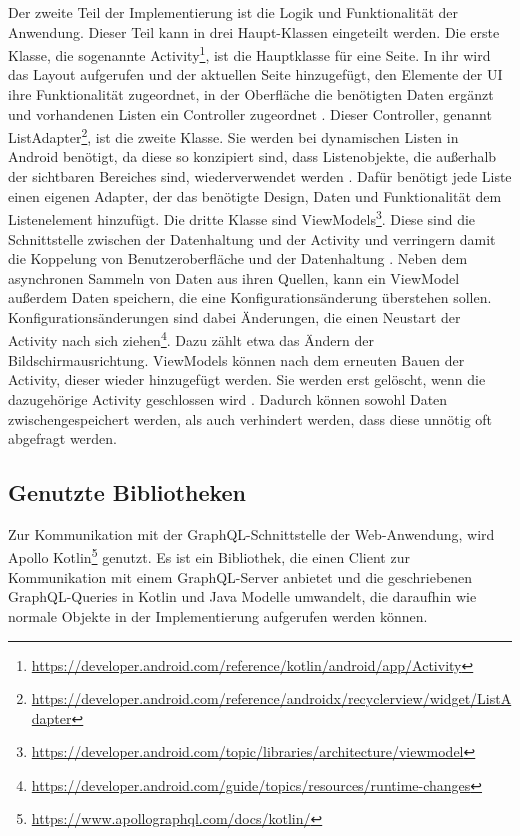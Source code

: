 Der zweite Teil der Implementierung ist die Logik und Funktionalität der Anwendung. Dieser Teil kann in drei Haupt-Klassen eingeteilt werden. 
Die erste Klasse, die sogenannte Activity\footnote{\url{https://developer.android.com/reference/kotlin/android/app/Activity}}, ist die Hauptklasse für eine Seite. In ihr wird das Layout aufgerufen und der aktuellen Seite hinzugefügt, den Elemente der UI ihre Funktionalität zugeordnet, in der Oberfläche die benötigten Daten ergänzt und vorhandenen Listen ein Controller zugeordnet \cite{sarkar_android}.
Dieser Controller, genannt ListAdapter\footnote{\url{https://developer.android.com/reference/androidx/recyclerview/widget/ListAdapter}}, ist die zweite Klasse. Sie werden bei dynamischen Listen in Android benötigt, da diese so konzipiert sind, dass Listenobjekte, die außerhalb der sichtbaren Bereiches sind, wiederverwendet werden \cite{recyclerview_android}. Dafür benötigt jede Liste einen eigenen Adapter, der das benötigte Design, Daten und Funktionalität dem Listenelement hinzufügt.
Die dritte Klasse sind ViewModels\footnote{\url{https://developer.android.com/topic/libraries/architecture/viewmodel}}. Diese sind die Schnittstelle zwischen der Datenhaltung und der Activity und verringern damit die Koppelung von Benutzeroberfläche und der Datenhaltung \cite{viewModel_android}. Neben dem asynchronen Sammeln von Daten aus ihren Quellen, kann ein ViewModel außerdem Daten speichern, die eine Konfigurationsänderung überstehen sollen. Konfigurationsänderungen sind dabei Änderungen, die einen Neustart der Activity nach sich ziehen\footnote{\url{https://developer.android.com/guide/topics/resources/runtime-changes}}. Dazu zählt etwa das Ändern der Bildschirmausrichtung. ViewModels können nach dem erneuten Bauen der Activity, dieser wieder hinzugefügt werden. Sie werden erst gelöscht, wenn die dazugehörige Activity geschlossen wird \cite{Android_Room}. Dadurch können sowohl Daten zwischengespeichert werden, als auch verhindert werden, dass diese unnötig oft abgefragt werden.


\subsection{Genutzte Bibliotheken}
\label{cha:4_1_bibliothek}
Zur Kommunikation mit der GraphQL-Schnittstelle der Web-Anwendung, wird Apollo Kotlin\footnote{\url{https://www.apollographql.com/docs/kotlin/}} genutzt. 
Es ist ein Bibliothek, die einen Client zur Kommunikation mit einem GraphQL-Server anbietet und die geschriebenen GraphQL-Queries in Kotlin und Java Modelle umwandelt, die daraufhin wie normale Objekte in der Implementierung aufgerufen werden können.

